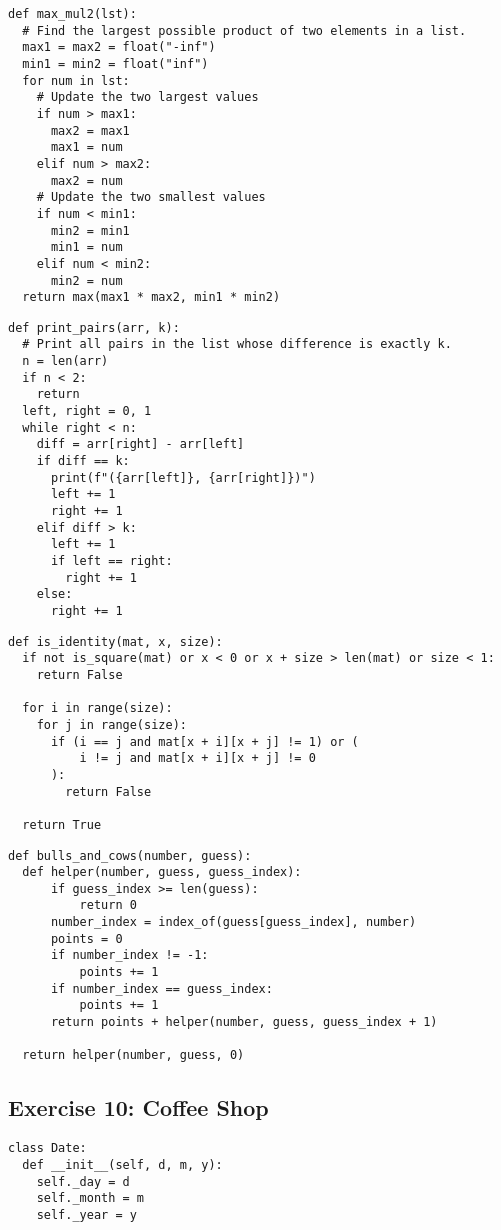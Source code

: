 \documentclass[11pt]{article}
\begin{document}
\begin{multicols}{2}
\vspace{-0.25cm}

\begin{multicols}{2}
\begin{lstlisting}
def max_mul2(lst):
  # Find the largest possible product of two elements in a list.
  max1 = max2 = float("-inf")
  min1 = min2 = float("inf")
  for num in lst:
    # Update the two largest values
    if num > max1:
      max2 = max1
      max1 = num
    elif num > max2:
      max2 = num
    # Update the two smallest values
    if num < min1:
      min2 = min1
      min1 = num
    elif num < min2:
      min2 = num
  return max(max1 * max2, min1 * min2)
\end{lstlisting}
\begin{lstlisting}
def print_pairs(arr, k):
  # Print all pairs in the list whose difference is exactly k.
  n = len(arr)
  if n < 2:
    return
  left, right = 0, 1
  while right < n:
    diff = arr[right] - arr[left]
    if diff == k:
      print(f"({arr[left]}, {arr[right]})")
      left += 1
      right += 1
    elif diff > k:
      left += 1
      if left == right:
        right += 1
    else:
      right += 1
\end{lstlisting}
\end{multicols}

\begin{lstlisting}
def is_identity(mat, x, size):
  if not is_square(mat) or x < 0 or x + size > len(mat) or size < 1:
    return False

  for i in range(size):
    for j in range(size):
      if (i == j and mat[x + i][x + j] != 1) or (
          i != j and mat[x + i][x + j] != 0
      ):
        return False

  return True
\end{lstlisting}

\begin{lstlisting}
def bulls_and_cows(number, guess):
  def helper(number, guess, guess_index):
      if guess_index >= len(guess):
          return 0
      number_index = index_of(guess[guess_index], number)
      points = 0
      if number_index != -1:
          points += 1
      if number_index == guess_index:
          points += 1
      return points + helper(number, guess, guess_index + 1)

  return helper(number, guess, 0)
\end{lstlisting}

\subsection{Exercise 10: Coffee Shop}\label{subsec:exercise-10}
\begin{lstlisting}
class Date:
  def __init__(self, d, m, y):
    self._day = d
    self._month = m
    self._year = y


\end{lstlisting}
\end{multicols}
\end{document}
